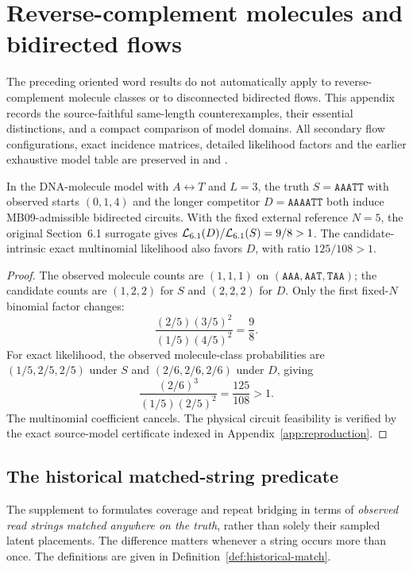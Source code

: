 \section{Reverse-complement molecules and bidirected flows}
\label{app:molecular-flow}

The preceding oriented word results do not automatically apply to
reverse-complement molecule classes or to disconnected bidirected flows.
This appendix records the source-faithful same-length counterexamples,
their essential distinctions, and a compact comparison of model domains.
All secondary flow configurations, exact incidence matrices, detailed
likelihood factors and the earlier exhaustive model table are preserved
in  and
.

\begin{theorem}
\label{thm:cex-molecule}
In the DNA-molecule model with $A\leftrightarrow T$ and $L=3$,
the truth $S=\texttt{AAATT}$ with observed starts $(0,1,4)$
and the longer competitor $D=\texttt{AAAATT}$ both induce
MB09-admissible bidirected circuits. With the fixed external
reference $N=5$, the original Section~6.1 surrogate gives
$\mathcal{L}_{6.1}(D)/\mathcal{L}_{6.1}(S)=9/8>1$.
The candidate-intrinsic exact multinomial likelihood also
favors $D$, with ratio $125/108>1$.
\end{theorem}
\begin{proof}
The observed molecule counts are $(1,1,1)$ on
$(\texttt{AAA},\texttt{AAT},\texttt{TAA})$; the candidate
counts are $(1,2,2)$ for $S$ and $(2,2,2)$ for $D$.
Only the first fixed-$N$ binomial factor changes:
\[
\frac{(2/5)(3/5)^2}{(1/5)(4/5)^2}=\frac98.
\]
For exact likelihood, the observed molecule-class probabilities
are $(1/5,2/5,2/5)$ under $S$ and
$(2/6,2/6,2/6)$ under $D$, giving
\[
\frac{(2/6)^3}{(1/5)(2/5)^2}=\frac{125}{108}>1.
\]
The multinomial coefficient cancels. The physical circuit feasibility is verified by the exact
source-model certificate indexed in Appendix~\ref{app:reproduction}.
\end{proof}

\subsection{The historical matched-string predicate}
\label{sec:finite:historical}

The supplement to \textcite{shomorony2016} formulates coverage
and repeat bridging in terms of \emph{observed read strings matched
anywhere on the truth}, rather than solely their sampled latent
placements. The difference matters whenever a string occurs more
than once. The definitions are given in
Definition~\ref{def:historical-match}.

